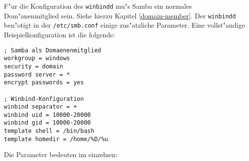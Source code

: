 \documentclass{scrartcl}\usepackage{pslatex}\typearea{12}
\newcommand{\prog}{\texttt}
\newcommand{\dateistyle}{\texttt}
\begin{document}
F"ur die Konfiguration des \prog{winbindd} mu"s Samba ein normales
Dom"anenmitglied sein. Siehe hierzu Kapitel \ref{domain-member}. Der
\prog{winbindd} ben"otigt in der \dateistyle{/etc/smb.conf} einige
zus"atzliche Parameter. Eine vollst"andige Beispielkonfiguration ist
die folgende:

\begin{verbatim}
; Samba als Domaenenmitglied
workgroup = windows
security = domain
password server = *
encrypt passwords = yes

; Winbind-Konfiguration
winbind separator = +
winbind uid = 10000-20000
winbind gid = 10000-20000
template shell = /bin/bash
template homedir = /home/%D/%u
\end{verbatim}

Die Parameter bedeuten im einzelnen:
\end{document}
